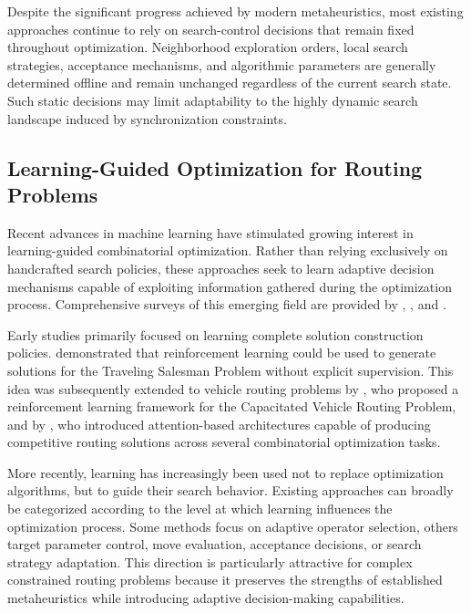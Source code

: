 Despite the significant progress achieved by modern metaheuristics, most existing approaches continue to rely on search-control decisions that remain fixed throughout optimization. Neighborhood exploration orders, local search strategies, acceptance mechanisms, and algorithmic parameters are generally determined offline and remain unchanged regardless of the current search state. Such static decisions may limit adaptability to the highly dynamic search landscape induced by synchronization constraints.

\subsection{Learning-Guided Optimization for Routing Problems}
Recent advances in machine learning have stimulated growing interest in learning-guided combinatorial optimization. Rather than relying exclusively on handcrafted search policies, these approaches seek to learn adaptive decision mechanisms capable of exploiting information gathered during the optimization process. Comprehensive surveys of this emerging field are provided by \citet{karimi2022machine}, \citet{mazyavkina2021reinforcement}, and \citet{bengio2021machine}.

Early studies primarily focused on learning complete solution construction policies. \citet{bello2017neural} demonstrated that reinforcement learning could be used to generate solutions for the Traveling Salesman Problem without explicit supervision. This idea was subsequently extended to vehicle routing problems by \citet{nazari2018reinforcement}, who proposed a reinforcement learning framework for the Capacitated Vehicle Routing Problem, and by \citet{kool2019attention}, who introduced attention-based architectures capable of producing competitive routing solutions across several combinatorial optimization tasks.

More recently, learning has increasingly been used not to replace optimization algorithms, but to guide their search behavior. Existing approaches can broadly be categorized according to the level at which learning influences the optimization process. Some methods focus on adaptive operator selection, others target parameter control, move evaluation, acceptance decisions, or search strategy adaptation. This direction is particularly attractive for complex constrained routing problems because it preserves the strengths of established metaheuristics while introducing adaptive decision-making capabilities.


